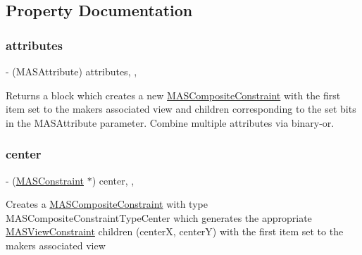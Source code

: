 \subsection{Property Documentation}
\mbox{\label{interface_m_a_s_constraint_maker_a06af1a154afe333292014c482b1dbf74}} 
\subsubsection{\texorpdfstring{attributes}{attributes}}
{\footnotesize\ttfamily -\/ (M\+A\+S\+Attribute) attributes\hspace{0.3cm}{\ttfamily [read]}, {\ttfamily [nonatomic]}, {\ttfamily [strong]}}

Returns a block which creates a new \mbox{\hyperlink{interface_m_a_s_composite_constraint}{M\+A\+S\+Composite\+Constraint}} with the first item set to the makers associated view and children corresponding to the set bits in the M\+A\+S\+Attribute parameter. Combine multiple attributes via binary-\/or. \mbox{\label{interface_m_a_s_constraint_maker_ae101ae0527817e71bef0b9da59fcb317}} 
\subsubsection{\texorpdfstring{center}{center}}
{\footnotesize\ttfamily -\/ (\mbox{\hyperlink{interface_m_a_s_constraint}{M\+A\+S\+Constraint}} $\ast$) center\hspace{0.3cm}{\ttfamily [read]}, {\ttfamily [nonatomic]}, {\ttfamily [strong]}}

Creates a \mbox{\hyperlink{interface_m_a_s_composite_constraint}{M\+A\+S\+Composite\+Constraint}} with type M\+A\+S\+Composite\+Constraint\+Type\+Center which generates the appropriate \mbox{\hyperlink{interface_m_a_s_view_constraint}{M\+A\+S\+View\+Constraint}} children (centerX, centerY) with the first item set to the makers associated view \mbox{\label{interface_m_a_s_constraint_maker_a9344b85f1d75d2261bfcedc3b716024c}} 
